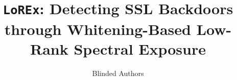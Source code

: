 \documentclass[letterpaper,twocolumn,10pt]{article}
\begin{document}
\date{}



\title{\texttt{LoREx}: Detecting SSL Backdoors through Whitening-Based Low-Rank Spectral Exposure}

\author{
{\rm Blinded Authors}
}

\maketitle

\end{document}
